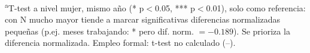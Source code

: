 \documentclass[11pt]{article}
\begin{document}
\begin{table}[!ht]
\begin{minipage}{0.95\textwidth}
\textsuperscript{a}T-test a nivel mujer, mismo a\~no (* p$<$0.05, *** p$<$0.01), solo como referencia: con N mucho mayor tiende a marcar significativas diferencias normalizadas peque\~nas (p.ej. meses trabajando: * pero dif. norm. $=-0.189$). Se prioriza la diferencia normalizada. Empleo formal: t-test no calculado (--).
\end{minipage}

\end{table}
\end{document}
